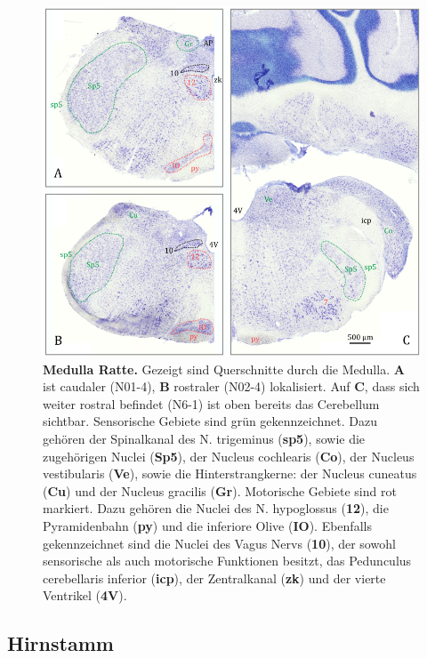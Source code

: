 \documentclass[12pt,a4paper,pdftex]{article}
\begin{document}
\begin{figure}[H]
    \centering
    \includegraphics[width=\textwidth]{pictures/Bilder_Jule/Ratte/medulla.png}
    \caption[Medulla Ratte]{\textbf{Medulla Ratte.} Gezeigt sind Querschnitte durch die Medulla. \textbf{A} ist caudaler (N01-4), \textbf{B} rostraler (N02-4) lokalisiert. Auf \textbf{C}, dass sich weiter rostral befindet (N6-1) ist oben bereits das Cerebellum sichtbar. Sensorische Gebiete sind grün gekennzeichnet. Dazu gehören der Spinalkanal des N. trigeminus (\textbf{sp5}), sowie die zugehörigen Nuclei (\textbf{Sp5}), der Nucleus cochlearis (\textbf{Co}), der Nucleus vestibularis (\textbf{Ve}), sowie die Hinterstrangkerne: der Nucleus cuneatus (\textbf{Cu}) und der Nucleus gracilis (\textbf{Gr}). Motorische Gebiete sind rot markiert. Dazu gehören die Nuclei des N. hypoglossus (\textbf{12}), die Pyramidenbahn (\textbf{py}) und die inferiore Olive (\textbf{IO}). Ebenfalls gekennzeichnet sind die Nuclei des Vagus Nervs (\textbf{10}), der sowohl sensorische als auch motorische Funktionen besitzt, das Pedunculus cerebellaris inferior (\textbf{icp}), der Zentralkanal (\textbf{zk}) und der vierte Ventrikel (\textbf{4V}).} 
    \label{fig:medulla_ratte}
\end{figure}{}


\subsection{Hirnstamm}
\label{subsec:Hirnstamm} 
\end{document}
